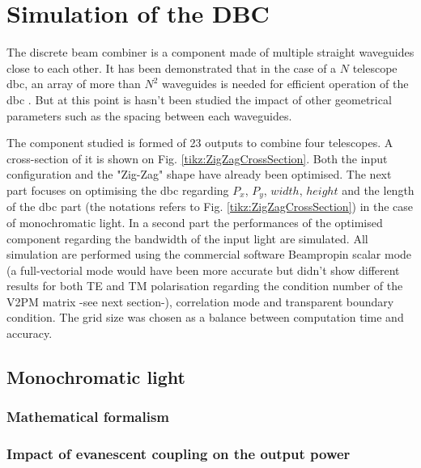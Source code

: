 \documentclass[a4paper,twoside,11pt]{article}
\begin{document}
\section{Simulation of the DBC}
    
    The discrete beam combiner is a component made of multiple straight waveguides close to each other. It has been demonstrated that in the case of a $N$ telescope \gls{dbc}, an array of more than $N^2$ waveguides is needed for efficient operation of the \gls{dbc} \cite{minardi1}. But at this point is hasn't been studied the impact of other geometrical parameters such as the spacing between each waveguides. 
    
    The component studied is formed of 23 outputs to combine four telescopes. A cross-section of it is shown on Fig. \ref{tikz:ZigZagCrossSection}. Both the input configuration and the "Zig-Zag" shape have already been optimised. The next part focuses on optimising the \gls{dbc} regarding $P_x$, $P_y$, $width$, $height$ and the length of the \gls{dbc} part (the notations refers to Fig. \ref{tikz:ZigZagCrossSection}) in the case of monochromatic light. In a second part the performances of the optimised component regarding the bandwidth of the input light are simulated. All simulation are performed using the commercial software Beamprop\textcompwordmark in scalar mode (a full-vectorial mode would have been more accurate but didn't show different results for both TE and TM polarisation regarding the condition number of the V2PM matrix -see next section-), correlation mode and transparent boundary condition. The grid size was chosen as a balance between computation time and accuracy.
    

    \subsection{Monochromatic light}

        \subsubsection{Mathematical formalism}
        
        
        \subsubsection{Impact of evanescent coupling on the output power}
        
        
\end{document}
